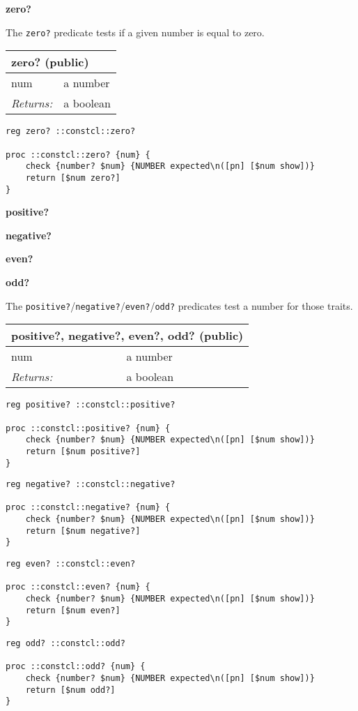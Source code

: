 \documentclass{report}
\begin{document}
\textbf{zero?}


The \texttt{zero?} predicate tests if a given number is equal to zero.

\begin{tabular}{ |l l| }
\hline
\multicolumn{2}{|l|}{zero? (public)} \\
\hline
num & a number \\
\textit{Returns:} & a boolean \\
\hline
\end{tabular}

\noindent\makebox[\linewidth]{\rule{\linewidth}{0.4pt}}
\begin{lstlisting}
reg zero? ::constcl::zero?
 
proc ::constcl::zero? {num} {
    check {number? $num} {NUMBER expected\n([pn] [$num show])}
    return [$num zero?]
}
\end{lstlisting}
\noindent\makebox[\linewidth]{\rule{\linewidth}{0.4pt}}

\textbf{positive?}


\textbf{negative?}


\textbf{even?}


\textbf{odd?}


The \texttt{positive?}/\texttt{negative?}/\texttt{even?}/\texttt{odd?} predicates test a number for those traits.

\begin{tabular}{ |l l| }
\hline
\multicolumn{2}{|l|}{positive?, negative?, even?, odd? (public)} \\
\hline
num & a number \\
\textit{Returns:} & a boolean \\
\hline
\end{tabular}

\noindent\makebox[\linewidth]{\rule{\linewidth}{0.4pt}}
\begin{lstlisting}
reg positive? ::constcl::positive?
 
proc ::constcl::positive? {num} {
    check {number? $num} {NUMBER expected\n([pn] [$num show])}
    return [$num positive?]
}
\end{lstlisting}
\noindent\makebox[\linewidth]{\rule{\linewidth}{0.4pt}}
\noindent\makebox[\linewidth]{\rule{\linewidth}{0.4pt}}
\begin{lstlisting}
reg negative? ::constcl::negative?
 
proc ::constcl::negative? {num} {
    check {number? $num} {NUMBER expected\n([pn] [$num show])}
    return [$num negative?]
}
\end{lstlisting}
\noindent\makebox[\linewidth]{\rule{\linewidth}{0.4pt}}
\noindent\makebox[\linewidth]{\rule{\linewidth}{0.4pt}}
\begin{lstlisting}
reg even? ::constcl::even?
 
proc ::constcl::even? {num} {
    check {number? $num} {NUMBER expected\n([pn] [$num show])}
    return [$num even?]
}
\end{lstlisting}
\noindent\makebox[\linewidth]{\rule{\linewidth}{0.4pt}}
\noindent\makebox[\linewidth]{\rule{\linewidth}{0.4pt}}
\begin{lstlisting}
reg odd? ::constcl::odd?
 
proc ::constcl::odd? {num} {
    check {number? $num} {NUMBER expected\n([pn] [$num show])}
    return [$num odd?]
}
\end{lstlisting}
\noindent\makebox[\linewidth]{\rule{\linewidth}{0.4pt}}
\end{document}
